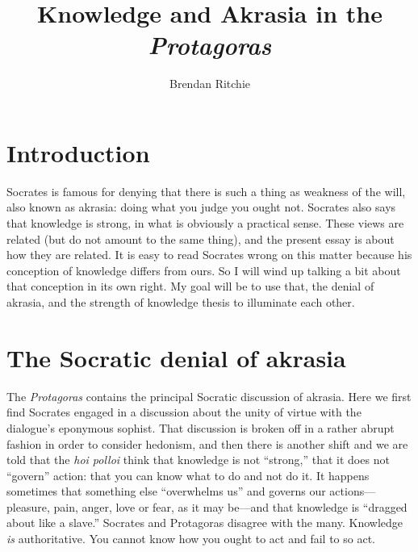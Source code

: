 \documentclass[11pt]{amsart}
\author{Brendan Ritchie} \title{Knowledge and Akrasia in the \emph{Protagoras}}
\begin{document}
\maketitle


\section{Introduction}

Socrates is famous for denying that there is such a thing as weakness of the will, also known as akrasia: doing what you judge you ought not. Socrates also says that knowledge is strong, in what is obviously a practical sense. These views are related (but do not amount to the same thing), and the present essay is about how they are related. It is easy to read Socrates wrong on this matter because his conception of knowledge differs from ours. So I will wind up talking a bit about that conception in its own right. My goal will be to use that, the denial of akrasia, and the strength of knowledge thesis to illuminate each other.

\section{The Socratic denial of akrasia}

The \emph{Protagoras} contains the principal Socratic discussion of akrasia. Here we first find Socrates engaged in a discussion about the unity of virtue with the dialogue's eponymous sophist. That discussion is broken off in a rather abrupt fashion in order to consider hedonism, and then there is another shift and we are told that the \emph{hoi polloi} think that knowledge is not ``strong,'' that it does not ``govern'' action: that you can know what to do and not do it. It happens sometimes that something else ``overwhelms us'' and governs our actions---pleasure, pain, anger, love or fear, as it may be---and that knowledge is ``dragged about like a slave.'' Socrates and Protagoras disagree with the many. Knowledge \emph{is} authoritative. You cannot know how you ought to act and fail to so act.


\end{document}
